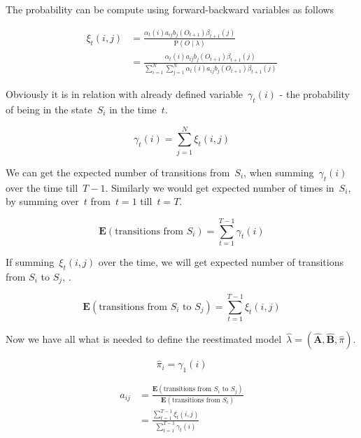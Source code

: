 \documentclass[thesis=M,english]{FITthesis}[2012/10/20]
\newcommand{\matr}[1]{\mathbf{#1}}
\begin{document}
The probability can be compute using forward-backward variables as follows
 
\begin{equation}\label{eq:xi}
\begin{aligned}
\xi_t(i,j) &= \frac{ \alpha_t(i) a_{ij} b_j(O_{t+1}) \beta_{t+1}(j) }
		   		   { \mathrm{P}( O \mid \lambda ) } \\
		   &= \frac{ \alpha_t(i) a_{ij} b_j(O_{t+1}) \beta_{t+1}(j) }
		   		   { \sum\limits_{i=1}^N \sum\limits_{j=1}^N \alpha_t(i) a_{ij} b_j(O_{t+1}) \beta_{t+1}(j) }
\end{aligned}
\end{equation}

Obviously it is in relation with already defined variable~$\gamma_t(i)$ - the probability of being in the state~$S_i$ in the time~$t$.

\begin{equation}
\gamma_t(i) = \sum_{j=1}^N \xi_t(i,j)  
\end{equation}

We can get the expected number of transitions from~$S_i$, when summing~$\gamma_t(i)$ over the time till~$T-1$. Similarly we would get expected number of times in~$S_i$, by summing over~$t$ from~$t=1$ till~$t=T$. 

\begin{equation}
\mathbf{E}(\text{transitions from $S_i$}) = \sum_{t=1}^{T-1} \gamma_t(i)  
\end{equation}

If summing~$\xi_t(i,j)$ over the time, we will get expected number of transitions from $S_i$ to $S_j$, . 

\begin{equation}
\mathbf{E}(\text{transitions from $S_i$ to $S_j$}) = \sum_{t=1}^{T-1} \xi_t(i,j)  
\end{equation}

Now we have all what is needed to define the reestimated model~$\hat\lambda=(\hat{\matr{A}},\hat{\matr{B}},\hat\pi)$.

\begin{equation}\label{eq:bwpi}
\hat\pi_i = \gamma_1(i)  
\end{equation}

\begin{equation}\label{eq:bwa}
\begin{aligned}
\hat a_{ij} &= \frac{\mathbf{E}(\text{transitions from $S_i$ to $S_j$})}
				   {\mathbf{E}(\text{transitions from $S_i$})}  \\
		    &= \frac{\sum\limits_{t=1}^{T-1} \xi_t(i,j)}{\sum\limits_{t=1}^{T-1} \gamma_t(i) }
\end{aligned}
\end{equation}
\end{document}
